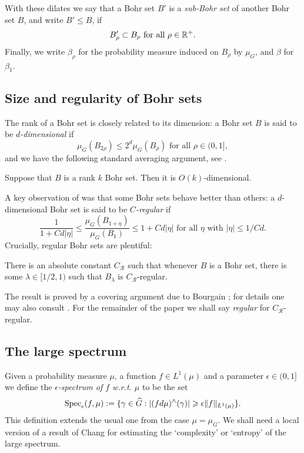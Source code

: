 \documentclass[12pt]{amsart}  %
\begin{document}
With these dilates we say that a Bohr set $B'$ is a \emph{sub-Bohr set} of another Bohr set $B$, and write $B' \leq B$, if 
\begin{equation*}
B'_\rho \subset B_{\rho} \textrm{ for all } \rho \in \mathbb{R}^+.
\end{equation*}
Finally, we write $\beta_\rho$ for the probability measure induced on $B_\rho$ by $\mu_G$, and $\beta$ for $\beta_1$. 

\subsection{Size and regularity of Bohr sets} The rank of a Bohr set is closely related to its dimension: a Bohr set $B$ is said to be \emph{$d$-dimensional} if
\begin{equation*}
\mu_G(B_{2\rho}) \leq 2^d\mu_G(B_\rho) \textrm{ for all } \rho \in (0,1],
\end{equation*}
and we have the following standard averaging argument, see \cite[Lemma 4.20]{taovu::}.
\begin{lemma}\label{lem.bohrsize} Suppose that $B$ is a rank $k$ Bohr set.  Then it is $O(k)$-dimensional.
\end{lemma}

A key observation of \cite{bou::5} was that some Bohr sets behave better than others: a $d$-dimensional Bohr set is said to be \emph{$C$-regular} if
\begin{equation*}
\frac{1}{1+Cd |\eta|} \leq \frac{\mu_G(B_{1+\eta})}{\mu_G(B_1)} \leq 1+Cd|\eta| \textrm{ for all } \eta \textrm{ with } |\eta| \leq 1/Cd.
\end{equation*}
Crucially, regular Bohr sets are plentiful:
\begin{lemma}\label{lem.ubreg} There is an absolute constant $C_\mathcal{R}$ such that whenever $B$ is a Bohr set, there is some $\lambda \in [1/2,1)$ such that $B_\lambda$ is $C_\mathcal{R}$-regular.
\end{lemma}
The result is proved by a covering argument due to Bourgain \cite{bou::5}; for details one may also consult \cite[Lemma 4.25]{taovu::}.  For the remainder of the paper we shall say \emph{regular} for $C_\mathcal{R}$-regular.

\subsection{The large spectrum} Given a probability measure $\mu$, a function $f \in L^1(\mu)$ and a parameter $\epsilon \in (0,1]$ we define the \emph{$\epsilon$-spectrum of $f$ w.r.t. $\mu$} to be the set
\begin{equation*}
\mathop{\rm Spec}\nolimits_\epsilon(f,\mu):=\{\gamma \in \widehat{G}: |(fd\mu)^\wedge(\gamma)| \geqslant \epsilon\|f\|_{L^1(\mu)}\}.
\end{equation*}
This definition extends the usual one from the case $\mu=\mu_G$.  We shall need a local version of a result of Chang \cite{cha::0} for estimating the `complexity' or `entropy' of the large spectrum.  
\end{document}
